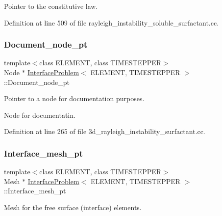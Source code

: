 Pointer to the constitutive law. 



Definition at line 509 of file rayleigh\+\_\+instability\+\_\+soluble\+\_\+surfactant.\+cc.

\mbox{\label{classInterfaceProblem_a852833a405566b7f08b852e7174cfdeb}} 
\subsubsection{\texorpdfstring{Document\+\_\+node\+\_\+pt}{Document\_node\_pt}}
{\footnotesize\ttfamily template$<$class E\+L\+E\+M\+E\+NT, class T\+I\+M\+E\+S\+T\+E\+P\+P\+ER$>$ \\
Node $\ast$ \hyperlink{classInterfaceProblem}{Interface\+Problem}$<$ E\+L\+E\+M\+E\+NT, T\+I\+M\+E\+S\+T\+E\+P\+P\+ER $>$\+::Document\+\_\+node\+\_\+pt\hspace{0.3cm}{\ttfamily [private]}}



Pointer to a node for documentation purposes. 

Node for documentatin. 

Definition at line 265 of file 3d\+\_\+rayleigh\+\_\+instability\+\_\+surfactant.\+cc.

\mbox{\label{classInterfaceProblem_afd6b076362ccdb4ade0450fa3d3bf1ac}} 
\subsubsection{\texorpdfstring{Interface\+\_\+mesh\+\_\+pt}{Interface\_mesh\_pt}}
{\footnotesize\ttfamily template$<$class E\+L\+E\+M\+E\+NT, class T\+I\+M\+E\+S\+T\+E\+P\+P\+ER$>$ \\
Mesh $\ast$ \hyperlink{classInterfaceProblem}{Interface\+Problem}$<$ E\+L\+E\+M\+E\+NT, T\+I\+M\+E\+S\+T\+E\+P\+P\+ER $>$\+::Interface\+\_\+mesh\+\_\+pt}



Mesh for the free surface (interface) elements. 



